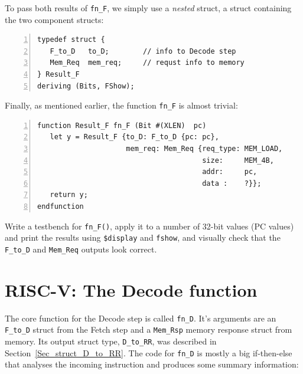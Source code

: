 \vspace*{2ex}


To pass both results of \verb|fn_F|, we simply use a \emph{nested}
struct, {\ie} a struct containing the two component structs:

{\small
\begin{Verbatim}[frame=single, numbers=left]
typedef struct {
   F_to_D   to_D;        // info to Decode step
   Mem_Req  mem_req;     // requst info to memory
} Result_F
deriving (Bits, FShow);
\end{Verbatim}
}

Finally, as mentioned earlier, the function \verb|fn_F| is almost
trivial:

{\small
\begin{Verbatim}[frame=single, numbers=left]
function Result_F fn_F (Bit #(XLEN)  pc)
   let y = Result_F {to_D: F_to_D {pc: pc},
                     mem_req: Mem_Req {req_type: MEM_LOAD,
                                       size:     MEM_4B,
                                       addr:     pc,
                                       data :    ?}};
   return y;
endfunction
\end{Verbatim}
}


\hdivider

\Exercise

Write a testbench for \verb|fn_F()|, apply it to a number of 32-bit
values (PC values) and print the results using \verb|$display| and
\verb|fshow|, and visually check that the \verb|F_to_D| and
\verb|Mem_Req| outputs look correct.

\Endexercise


\section{RISC-V: The Decode function}

\label{Sec_Decode_Function}


The core function for the Decode step is called \verb|fn_D|.  It's
arguments are an \verb|F_to_D| struct from the Fetch step and a
\verb|Mem_Rsp| memory response struct from memory.  Its output struct
type, \verb|D_to_RR|, was described in
Section~\ref{Sec_struct_D_to_RR}.  The code for \verb|fn_D| is mostly
a big if-then-else that analyses the incoming instruction and produces
some summary information:


